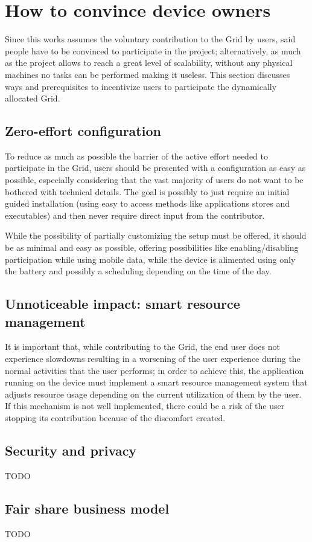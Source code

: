 \section{How to convince device owners}
Since this works assumes the voluntary contribution to the Grid by users, said people have to be convinced to participate in the project; alternatively, as much as the project allows to reach a great level of scalability, without any physical machines no tasks can be performed making it useless. This section discusses ways and prerequisites to incentivize users to participate the dynamically allocated Grid.

\subsection{Zero-effort configuration}
To reduce as much as possible the barrier of the active effort needed to participate in the Grid, users should be presented with a configuration as easy as possible, especially considering that the vast majority of users do not want to be bothered with technical details. The goal is possibly to just require an initial guided installation (using easy to access methods like applications stores and executables) and then never require direct input from the contributor.

While the possibility of partially customizing the setup must be offered, it should be as minimal and easy as possible, offering possibilities like enabling/disabling participation while using mobile data, while the device is alimented using only the battery and possibly a scheduling depending on the time of the day. 

\subsection{Unnoticeable impact: smart resource management}
It is important that, while contributing to the Grid, the end user does not experience slowdowns resulting in a worsening of the user experience during the normal activities that the user performs; in order to achieve this, the application running on the device must implement a smart resource management system that adjusts resource usage depending on the current utilization of them by the user. If this mechanism is not well implemented, there could be a risk of the user stopping its contribution because of the discomfort created.

\subsection{Security and privacy}
TODO

\subsection{Fair share business model}
TODO
